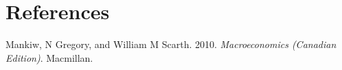 \documentclass[
  11pt,
  letterpaper,
]{ctexbook}
\newlength{\cslhangindent}
\newenvironment{CSLReferences}[2] %
 {\begin{list}{}{%
  \setlength{\itemindent}{0pt}
  \setlength{\leftmargin}{0pt}
  \setlength{\parsep}{0pt}
  \ifodd #1
   \setlength{\leftmargin}{\cslhangindent}
   \setlength{\itemindent}{-1\cslhangindent}
  \fi
  \setlength{\itemsep}{#2\baselineskip}}}
 {\end{list}}
\begin{document}

\chapter*{References}\label{references}


\label{refs}
\begin{CSLReferences}{1}{0}
Mankiw, N Gregory, and William M Scarth. 2010. \emph{Macroeconomics
(Canadian Edition)}. Macmillan.

\end{CSLReferences}


\backmatter
\end{document}
